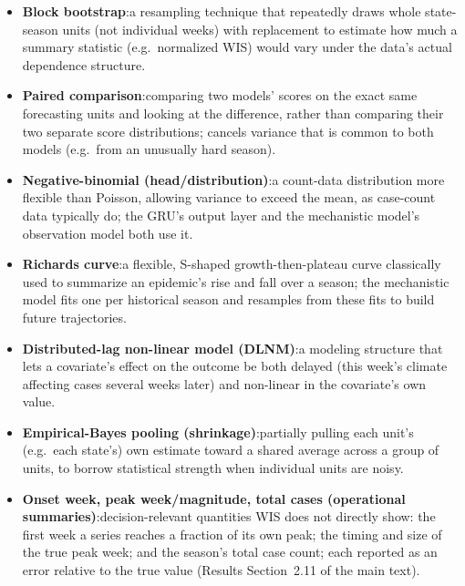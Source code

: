 \documentclass[11pt]{article}
\begin{document}
\begin{itemize}
week within a fold's cutoff-filtered history becomes a candidate forecast origin, crossed with
horizons 1--67 weeks ahead, so a handful of true evaluation windows becomes tens of thousands of
training rows.
\item \textbf{Block bootstrap}:a resampling technique that repeatedly draws whole state-season
units (not individual weeks) with replacement to estimate how much a summary statistic (e.g.\
normalized WIS) would vary under the data's actual dependence structure.
\item \textbf{Paired comparison}:comparing two models' scores on the exact same forecasting units
and looking at the difference, rather than comparing their two separate score distributions; cancels
variance that is common to both models (e.g.\ from an unusually hard season).
\item \textbf{Negative-binomial (head/distribution)}:a count-data distribution more flexible than
Poisson, allowing variance to exceed the mean, as case-count data typically do; the GRU's output
layer and the mechanistic model's observation model both use it.
\item \textbf{Richards curve}:a flexible, S-shaped growth-then-plateau curve classically used to
summarize an epidemic's rise and fall over a season; the mechanistic model fits one per historical
season and resamples from these fits to build future trajectories.
\item \textbf{Distributed-lag non-linear model (DLNM)}:a modeling structure that lets a
covariate's effect on the outcome be both delayed (this week's climate affecting cases several
weeks later) and non-linear in the covariate's own value.
\item \textbf{Empirical-Bayes pooling (shrinkage)}:partially pulling each unit's (e.g.\ each
state's) own estimate toward a shared average across a group of units, to borrow statistical
strength when individual units are noisy.
\item \textbf{Onset week, peak week/magnitude, total cases (operational summaries)}:decision-relevant
quantities WIS does not directly show: the first week a series reaches a fraction of its own peak;
the timing and size of the true peak week; and the season's total case count; each reported as an
error relative to the true value (Results Section~2.11 of the main text).
\end{itemize}
\end{document}
